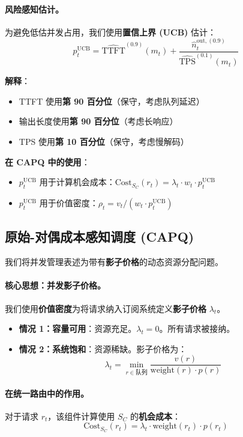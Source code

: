 \documentclass[11pt]{article}
\begin{document}
\paragraph{风险感知估计。}
为避免低估并发占用，我们使用\textbf{置信上界 (UCB)} 估计：
\[ p_t^{\text{UCB}} = \widehat{\text{TTFT}}^{(0.9)}(m_t) + \frac{\hat{n}^{\text{out},(0.9)}_t}{\widehat{\text{TPS}}^{(0.1)}(m_t)} \]

\textbf{解释}：
\begin{itemize}
  \item TTFT 使用\textbf{第 90 百分位}（保守，考虑队列延迟）
  \item 输出长度使用\textbf{第 90 百分位}（考虑长响应）
  \item TPS 使用\textbf{第 10 百分位}（保守，考虑慢解码）
\end{itemize}

\textbf{在 CAPQ 中的使用}：
\begin{itemize}
  \item $p_t^{\text{UCB}}$ 用于计算机会成本：$\text{Cost}_{S_C}(r_t) = \lambda_t \cdot w_t \cdot p_t^{\text{UCB}}$
  \item $p_t^{\text{UCB}}$ 用于价值密度：$\rho_t = v_t / (w_t \cdot p_t^{\text{UCB}})$
\end{itemize}

\subsection{原始-对偶成本感知调度 (CAPQ)}

我们将并发管理表述为带有\textbf{影子价格}的动态资源分配问题。

\paragraph{核心思想：并发影子价格。}
我们使用\textbf{价值密度}为将请求纳入订阅系统定义\textbf{影子价格} $\lambda_t$。

\begin{itemize}
  \item \textbf{情况 1：容量可用}：资源充足。$\lambda_t = 0$。所有请求被接纳。
  \item \textbf{情况 2：系统饱和}：资源稀缺。影子价格为：
  \[ \lambda_t = \min_{r \in \text{队列}} \frac{v(r)}{\text{weight}(r) \cdot p(r)} \]
\end{itemize}

\paragraph{在统一路由中的作用。}
对于请求 $r_t$，该组件计算使用 $S_C$ 的\textbf{机会成本}：
\[ \text{Cost}_{S_C}(r_t) = \lambda_t \cdot \text{weight}(r_t) \cdot p(r_t) \]
\end{document}
